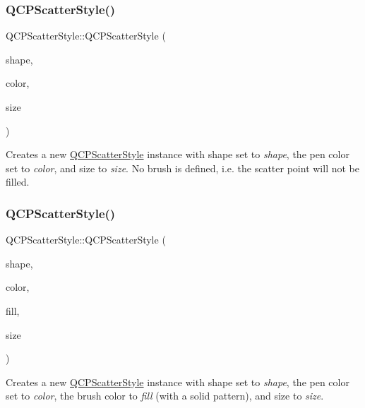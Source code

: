 \subsubsection{\texorpdfstring{Q\+C\+P\+Scatter\+Style()}{QCPScatterStyle()}\hspace{0.1cm}{\footnotesize\ttfamily [3/7]}}
{\footnotesize\ttfamily Q\+C\+P\+Scatter\+Style\+::\+Q\+C\+P\+Scatter\+Style (\begin{DoxyParamCaption}\item[{\hyperlink{class_q_c_p_scatter_style_adb31525af6b680e6f1b7472e43859349}{Scatter\+Shape}}]{shape,  }\item[{const Q\+Color \&}]{color,  }\item[{double}]{size }\end{DoxyParamCaption})}

Creates a new \hyperlink{class_q_c_p_scatter_style}{Q\+C\+P\+Scatter\+Style} instance with shape set to {\itshape shape}, the pen color set to {\itshape color}, and size to {\itshape size}. No brush is defined, i.\+e. the scatter point will not be filled. \mbox{\label{class_q_c_p_scatter_style_a6e1b64f12cac7f07af180ae4316fd38d}} 
\subsubsection{\texorpdfstring{Q\+C\+P\+Scatter\+Style()}{QCPScatterStyle()}\hspace{0.1cm}{\footnotesize\ttfamily [4/7]}}
{\footnotesize\ttfamily Q\+C\+P\+Scatter\+Style\+::\+Q\+C\+P\+Scatter\+Style (\begin{DoxyParamCaption}\item[{\hyperlink{class_q_c_p_scatter_style_adb31525af6b680e6f1b7472e43859349}{Scatter\+Shape}}]{shape,  }\item[{const Q\+Color \&}]{color,  }\item[{const Q\+Color \&}]{fill,  }\item[{double}]{size }\end{DoxyParamCaption})}

Creates a new \hyperlink{class_q_c_p_scatter_style}{Q\+C\+P\+Scatter\+Style} instance with shape set to {\itshape shape}, the pen color set to {\itshape color}, the brush color to {\itshape fill} (with a solid pattern), and size to {\itshape size}. \mbox{\label{class_q_c_p_scatter_style_a85acc4941d7e5c9bca5fa51377a77f49}} 
